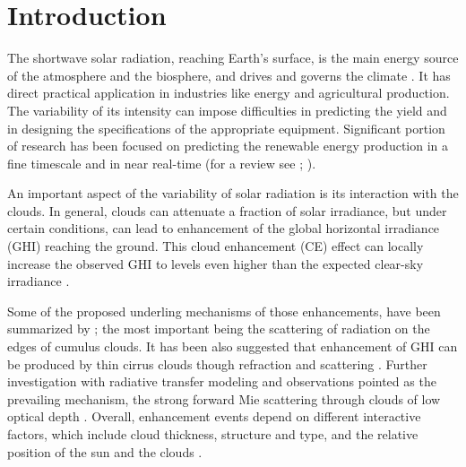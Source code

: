 \documentclass[preprint, 5p,
authoryear]{elsarticle} %
\begin{document}
\section{Introduction}\label{introduction}

The shortwave solar radiation, reaching Earth's surface, is the main
energy source of the atmosphere and the biosphere, and drives and
governs the climate \citep{Gray2010}. It has direct practical
application in industries like energy and agricultural production. The
variability of its intensity can impose difficulties in predicting the
yield and in designing the specifications of the appropriate equipment.
Significant portion of research has been focused on predicting the
renewable energy production in a fine timescale and in near real-time
(for a review see \citet{Inman2013}; \citet{Graabak2016}).

An important aspect of the variability of solar radiation is its
interaction with the clouds. In general, clouds can attenuate a fraction
of solar irradiance, but under certain conditions, can lead to
enhancement of the global horizontal irradiance (GHI) reaching the
ground. This cloud enhancement (CE) effect can locally increase the
observed GHI to levels even higher than the expected clear-sky
irradiance \citep[ and references
therein]{Cordero2023, Vamvakas2020, CastillejoCuberos2020, Vamvakas2020}.

Some of the proposed underling mechanisms of those enhancements, have
been summarized by \citet{Gueymard2017}; the most important being the
scattering of radiation on the edges of cumulus clouds. It has been also
suggested that enhancement of GHI can be produced by thin cirrus clouds
though refraction and scattering \citep{Thuillier2013}. Further
investigation with radiative transfer modeling and observations pointed
as the prevailing mechanism, the strong forward Mie scattering through
clouds of low optical depth
\citep{Pecenak2016, Thuillier2013, Yordanov2013, Yordanov2015}. Overall,
enhancement events depend on different interactive factors, which
include cloud thickness, structure and type, and the relative position
of the sun and the clouds \citep{Gueymard2017, Veerman2022}.
\end{document}
